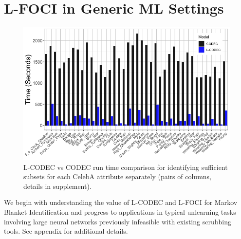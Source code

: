 \section{L-FOCI in Generic ML Settings}
\begin{figure}
    \centering
    \includegraphics[width=0.98\columnwidth,trim={0, 11.6cm, 0, 0},clip]{5_unlearn/figs/Speed_Hist.png}
    \vspace{-8pt}
    \caption{\label{fig:speed_hist} L-CODEC vs CODEC run time comparison for identifying sufficient subsets for each CelebA attribute separately (pairs of columns, details in supplement).}
\end{figure}
We begin with understanding the value of L-CODEC and L-FOCI for Markov Blanket Identification and progress to applications
in typical unlearning tasks involving large neural networks previously infeasible with existing scrubbing tools.
See appendix for additional details. 

